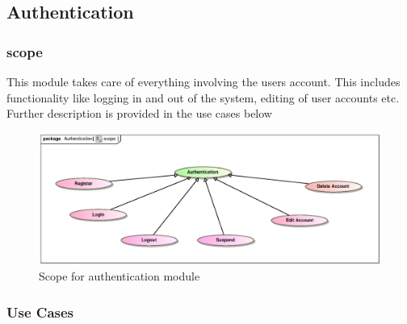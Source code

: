 \subsection{Authentication}

\subsubsection{scope}
\par{This module takes care of everything involving the users account. This includes functionality like logging in and out of the system, editing of user accounts etc. Further description is provided in the use cases below}

\begin{figure}[h]
	\includegraphics[scale=0.9]{epsImages/Authentication/AuthenticationScope.eps}
	\caption{Scope for authentication module}
\end{figure}

\newpage
\subsubsection{Use Cases}

